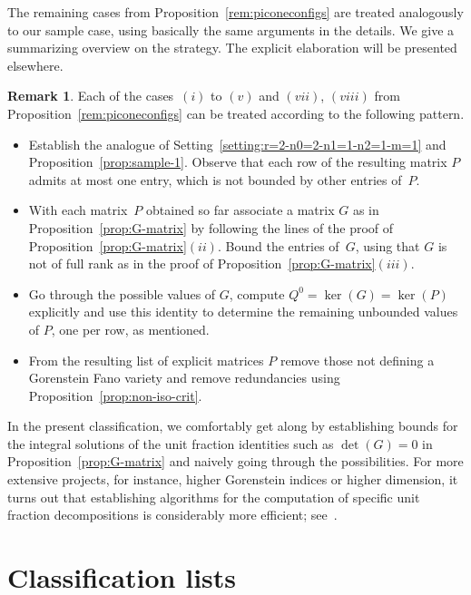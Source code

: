 \documentclass[pdftex]{sigma}%
\theoremstyle{definition}
\newtheorem{rema}[thm]{Remark}
\numberwithin{equation}{section}
\begin{document}
The remaining cases from Proposition~\ref{rem:piconeconfigs}
are treated analogously to our sample case, using basically
the same arguments in the details. We give a summarizing
overview on the strategy. The explicit elaboration will be
presented elsewhere.


\begin{rema}
Each of the cases~$(i)$ to $(v)$ and $(vii)$, $(viii)$ from
Proposition~\ref{rem:piconeconfigs} can be
treated according to the following pattern.
\begin{itemize}
\item
Establish the analogue of
Setting~\ref{setting:r=2-n0=2-n1=1-n2=1-m=1}
and Proposition~\ref{prop:sample-1}.
Observe that each row of the resulting
matrix $P$ admits at most one entry,
which is not bounded by other entries of~$P$.
\item
With each matrix~$P$ obtained so far
associate a matrix $G$ as in
Proposition~\ref{prop:G-matrix} by following
the lines of the proof of Proposition~\ref{prop:G-matrix}$(ii)$.
Bound the entries of~$G$, using that $G$ is not
of full rank as in the proof of Proposition~\ref{prop:G-matrix}$(iii)$.
\item
Go through the possible values of $G$,
compute $Q^0 = \ker(G) = \ker(P)$ explicitly
and use this identity to determine the remaining
unbounded values of $P$, one per row, as mentioned.
\item
From the resulting list of explicit matrices $P$ remove
those not defining a Gorenstein Fano variety
and remove redundancies using
Proposition~\ref{prop:non-iso-crit}.
\end{itemize}
\end{rema}


In the present classification, we comfortably
get along by establishing bounds for the integral
solutions of the unit fraction identities such as
$\det(G) = 0$ in Proposition~\ref{prop:G-matrix}
and naively going through the possibilities.
For more extensive projects, for instance, higher
Gorenstein indices or higher dimension, it
turns out that establishing algorithms for
the computation of specific unit fraction decompositions
is considerably more efficient; see~\cite{Ba,HaHaHaSp}.


\newpage

\section{Classification lists}
\label{sec:class-lists}
\end{document}
